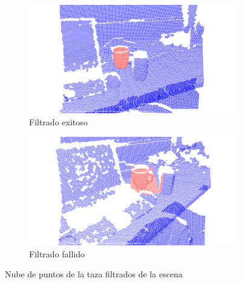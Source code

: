 \begin{figure}
	\centering
	\begin{subfigure}[b]{0.9\textwidth}
		\includegraphics[width=\textwidth]{img/taza_filtrado_exitoso_definitivo_depth_frame12.png}
		\caption{Filtrado exitoso}
		\label{filtro_en_deteccion_bien}
	\end{subfigure}
	\quad
	\begin{subfigure}[b]{0.9\textwidth}
		\includegraphics[width=\textwidth]{img/taza_filtrado_fallido_depth_simil_thresh_01_frame66.png}
		\caption{Filtrado fallido}
		\label{filtro_en_deteccion_mal}
	\end{subfigure}
	\caption{Nube de puntos de la taza filtrados de la escena}
	\label{filtro_en_deteccion}
\end{figure}


